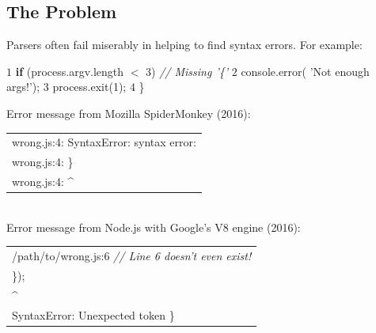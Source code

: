 \documentclass[a0,portrait]{a0poster}
\newcommand\tab[1][1cm]{\hspace*{#1}}
\newcommand{\textincon}[1]{%
{\fontfamily{zi4}\selectfont #1}}
\begin{document}
\vspace{1cm} %


\begin{multicols}{2} %


\color{Navy} %
\section*{The Problem}
\LARGE

Parsers often fail miserably in helping to find syntax errors. For example:

\color{Black}
\begin{algorithmic}
\State $1$ \textincon{\textbf{if} (process.argv.length $<$ 3)} \tab \textit{\color{red} // Missing '\{' }\color{Black}
\State $2$ \tab\tab \textincon{console.error(\color{NavyBlue} 'Not enough args!'}\color{Black});
\State $3$ \tab\tab \textincon{process.exit(1);}
\State $4$ \textincon{\}}
\end{algorithmic}

\color{NavyBlue} Error message from Mozilla SpiderMonkey (2016):\\\color{Black}
\begin{tabular}{|p{37cm}}
\tab \textincon{wrong.js:4: SyntaxError: syntax error:}\\
\tab \textincon{wrong.js:4: \}}\\
\tab \textincon{wrong.js:4: \^{}}
\end{tabular}
\\

\color{NavyBlue} Error message from Node.js with Google's V8 engine (2016):\\\color{Black}
\begin{tabular}{|p{37cm}}
\tab \textincon{/path/to/wrong.js:6} \tab \textit{\color{red} // Line 6 doesn't even exist!\color{Black}}\\
\tab \textincon{\});}\\
\tab \textincon{\^{}}\\
\tab \textincon{SyntaxError: Unexpected token \}}
\end{tabular}


\end{multicols}
\end{document}
